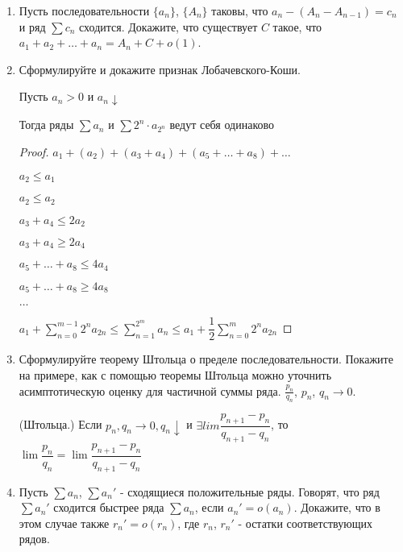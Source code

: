 \documentclass[a4paper]{article}
\begin{document}
\begin{enumerate}
\begin{proof}
        $c = \lim_{n \to \infty} \frac{a_n}{b_n} > 0$
        
        $\forall \epsilon\ \exists n_0:\ c - \epsilon \leqslant \frac{a_n}{b_n} \leqslant c + \epsilon$, при $n \geqslant n_0$
        
        Возьмём $c - \epsilon > 0 \implies (c - \epsilon)\cdot b_n \leqslant a_n \leqslant (c + \epsilon)\cdot b_n$
        
        Сходимость следует из правой части неравенства, а расходимость из левой. 
        \end{proof}
        \item Пусть последовательности $\{a_n\}$, $\{A_n\}$ таковы, что $a_n - (A_n - A_{n - 1}) = c_n$ и ряд $\sum c_n$ сходится.
        Докажите, что существует $C$ такое, что $a_1 + a_2 + \dots + a_n = A_n + C + o(1)$. 
        \item Сформулируйте и докажите признак Лобачевского-Коши.
        \begin{proposal}
            Пусть $a_n > 0$ и $a_n \downarrow$
        
            Тогда ряды $\sum a_n$ и $\sum 2^n \cdot a_{2^n}$ ведут себя одинаково
        \end{proposal}
        \begin{proof}
            $a_1 + (a_2) + (a_3 + a_4) + (a_5 + \dots + a_8) + \dots$
        
            $a_2 \leq a_1$
            
            $a_2 \leq a_2$
        
            
            $a_3 + a_4 \leq 2a_2$
            
            $a_3 + a_4 \geq 2a_4$
        
            $a_5 + \dots + a_8 \leq 4a_4$
        
            $a_5 + \dots + a_8 \geq 4a_8$
        
        
            $\dots$
        
            $a_1 + \sum_{n=0}^{m - 1} 2^n a_{2n} \leq \sum_{n = 1}^{2^m} a_n \leq a_1 + \dfrac{1}{2} \sum_{n=0}^{m} 2^n a_{2n}$
        
        \end{proof}
        \item Сформулируйте теорему Штольца о пределе последовательности. Покажите на примере, как с помощью теоремы Штольца можно уточнить асимптотическую оценку для частичной суммы ряда. $\frac{p_n}{q_n}$, $p_n$, $q_n \to 0$.
        \begin{theorem}
            (Штольца.) Если $p_n, q_n \to 0, q_n \downarrow$ и $\exists lim \dfrac{p_{n + 1} - p_n}{q_{n + 1} - q_n}$, то
            $\lim \dfrac{p_n}{q_n} = \lim \dfrac{p_{n + 1} - p_n}{q_{n + 1} - q_n}$
        \end{theorem}
        \item Пусть $\sum a_n$, $\sum a_n'$ - сходящиеся положительные ряды. Говорят, что ряд $\sum a_n'$ сходится быстрее ряда $\sum a_n$, если $a_n' = o(a_n)$. Докажите, что в этом случае также $r_n' = o(r_n)$, где $r_n$, $r_n'$ - остатки соответствующих рядов.
        

\end{enumerate}
\end{document}
